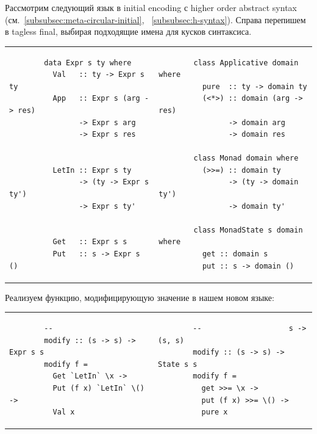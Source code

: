 Рассмотрим следующий язык в initial encoding с higher order abstract syntax (см.~\ref{subsubsec:meta-circular-initial}, ~\ref{subsubsec:h-syntax}).
Справа перепишем в tagless final, выбирая подходящие имена для кусков синтаксиса.

\begin{tabular}{p{8cm}p{8cm}}
    \begin{verbatim}
        data Expr s ty where
          Val   :: ty -> Expr s ty
          App   :: Expr s (arg -> res)
                -> Expr s arg
                -> Expr s res


          LetIn :: Expr s ty
                -> (ty -> Expr s ty')
                -> Expr s ty'


          Get   :: Expr s s
          Put   :: s -> Expr s ()
    \end{verbatim}
    &
    \begin{verbatim}
        class Applicative domain where
          pure  :: ty -> domain ty
          (<*>) :: domain (arg -> res)
                -> domain arg
                -> domain res

        class Monad domain where
          (>>=) :: domain ty
                -> (ty -> domain ty')
                -> domain ty'

        class MonadState s domain where
          get :: domain s
          put :: s -> domain ()
    \end{verbatim}
\end{tabular}
\vspace{1em}

Реализуем функцию, модифицирующую значение в нашем новом языке:

\begin{tabular}{p{8cm}p{8cm}}
    \begin{verbatim}
        --
        modify :: (s -> s) -> Expr s s
        modify f =
          Get `LetIn` \x ->
          Put (f x) `LetIn` \() ->
          Val x
    \end{verbatim}
    &
    \begin{verbatim}
        --                    s -> (s, s)
        modify :: (s -> s) -> State s s
        modify f =
          get >>= \x ->
          put (f x) >>= \() ->
          pure x
    \end{verbatim}
\end{tabular}
\vspace{1em}

